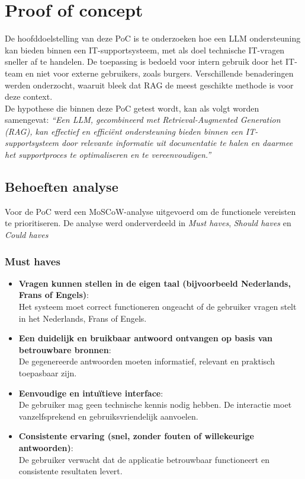 \chapter{Proof of concept}
\label{ch:proof-of-concept}

De hoofddoelstelling van deze PoC is te onderzoeken hoe een LLM ondersteuning kan bieden binnen een IT-supportsysteem, met als doel technische IT-vragen sneller af te handelen. De toepassing is bedoeld voor intern gebruik door het IT-team en niet voor externe gebruikers, zoals burgers. Verschillende benaderingen werden onderzocht, waaruit bleek dat RAG de meest geschikte methode is voor deze context.
\\[1em]
De hypothese die binnen deze PoC getest wordt, kan als volgt worden samengevat:
\textit{“Een LLM, gecombineerd met Retrieval-Augmented Generation (RAG), kan effectief en efficiënt ondersteuning bieden binnen een IT-supportsysteem door relevante informatie uit documentatie te halen en daarmee het supportproces te optimaliseren en te vereenvoudigen.”}

\section{Behoeften analyse}
Voor de PoC werd een MoSCoW-analyse uitgevoerd om de functionele vereisten te prioritiseren.
De analyse werd onderverdeeld in \textit{Must haves}, \textit{Should haves} en \textit{Could haves}

\subsection{Must haves}
\begin{itemize}
    \item \textbf{Vragen kunnen stellen in de eigen taal (bijvoorbeeld Nederlands, Frans of Engels)}:\\ 
    Het systeem moet correct functioneren ongeacht of de gebruiker vragen stelt in het Nederlands, Frans of Engels.
    \item \textbf{Een duidelijk en bruikbaar antwoord ontvangen op basis van betrouwbare bronnen}:\\ 
    De gegenereerde antwoorden moeten informatief, relevant en praktisch toepasbaar zijn.
    \item \textbf{Eenvoudige en intuïtieve interface}:\\  
    De gebruiker mag geen technische kennis nodig hebben. De interactie moet vanzelfsprekend en gebruiksvriendelijk aanvoelen.
    \item \textbf{Consistente ervaring (snel, zonder fouten of willekeurige antwoorden)}:\\  
    De gebruiker verwacht dat de applicatie betrouwbaar functioneert en consistente resultaten levert.
\end{itemize}

